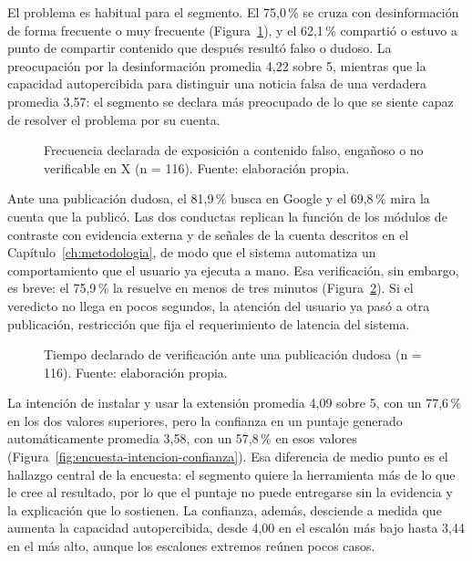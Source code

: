 El problema es habitual para el segmento. El 75,0\,\% se cruza con desinformación de forma frecuente o muy frecuente (Figura~\ref{fig:encuesta-exposicion}), y el 62,1\,\% compartió o estuvo a punto de compartir contenido que después resultó falso o dudoso. La preocupación por la desinformación promedia 4,22 sobre 5, mientras que la capacidad autopercibida para distinguir una noticia falsa de una verdadera promedia 3,57: el segmento se declara más preocupado de lo que se siente capaz de resolver el problema por su cuenta.

\begin{figure}[htbp]
  \centering
  
  \caption{Frecuencia declarada de exposición a contenido falso, engañoso o no verificable en X (n = 116). Fuente: elaboración propia.}
  \label{fig:encuesta-exposicion}
\end{figure}

Ante una publicación dudosa, el 81,9\,\% busca en Google y el 69,8\,\% mira la cuenta que la publicó. Las dos conductas replican la función de los módulos de contraste con evidencia externa y de señales de la cuenta descritos en el Capítulo~\ref{ch:metodologia}, de modo que el sistema automatiza un comportamiento que el usuario ya ejecuta a mano. Esa verificación, sin embargo, es breve: el 75,9\,\% la resuelve en menos de tres minutos (Figura~\ref{fig:encuesta-verificacion}). Si el veredicto no llega en pocos segundos, la atención del usuario ya pasó a otra publicación, restricción que fija el requerimiento de latencia del sistema.

\begin{figure}[htbp]
  \centering
  
  \caption{Tiempo declarado de verificación ante una publicación dudosa (n = 116). Fuente: elaboración propia.}
  \label{fig:encuesta-verificacion}
\end{figure}

La intención de instalar y usar la extensión promedia 4,09 sobre 5, con un 77,6\,\% en los dos valores superiores, pero la confianza en un puntaje generado automáticamente promedia 3,58, con un 57,8\,\% en esos valores (Figura~\ref{fig:encuesta-intencion-confianza}). Esa diferencia de medio punto es el hallazgo central de la encuesta: el segmento quiere la herramienta más de lo que le cree al resultado, por lo que el puntaje no puede entregarse sin la evidencia y la explicación que lo sostienen. La confianza, además, desciende a medida que aumenta la capacidad autopercibida, desde 4,00 en el escalón más bajo hasta 3,44 en el más alto, aunque los escalones extremos reúnen pocos casos.

